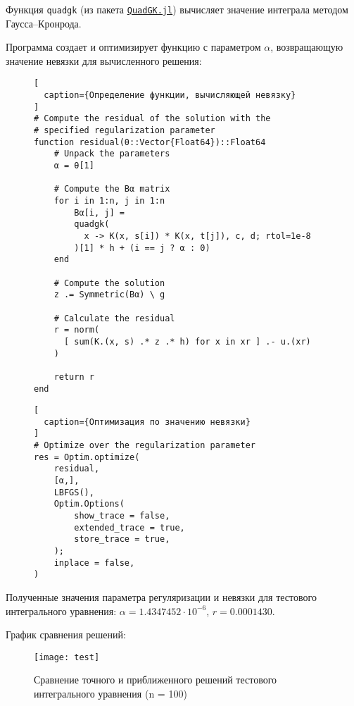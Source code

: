 \newpage

Функция {\footnotesize \texttt{quadgk}} (из пакета \href{https://juliamath.github.io/QuadGK.jl/stable/}{\footnotesize \texttt{QuadGK.jl}}) вычисляет значение интеграла методом Гаусса--Кронрода. \npar

Программа создает и оптимизирует функцию с параметром $ \alpha $, возвращающую значение невязки для вычисленного решения:

\begin{figure}[h!]
\begin{lstlisting}[
  caption={Определение функции, вычисляющей невязку}
]
# Compute the residual of the solution with the
# specified regularization parameter
function residual(θ::Vector{Float64})::Float64
    # Unpack the parameters
    α = θ[1]

    # Compute the Bα matrix
    for i in 1:n, j in 1:n
        Bα[i, j] =
        quadgk(
          x -> K(x, s[i]) * K(x, t[j]), c, d; rtol=1e-8
        )[1] * h + (i == j ? α : 0)
    end

    # Compute the solution
    z .= Symmetric(Bα) \ g

    # Calculate the residual
    r = norm(
      [ sum(K.(x, s) .* z .* h) for x in xr ] .- u.(xr)
    )

    return r
end
\end{lstlisting}
\end{figure}

\begin{figure}[h!]
\begin{lstlisting}[
  caption={Оптимизация по значению невязки}
]
# Optimize over the regularization parameter
res = Optim.optimize(
    residual,
    [α,],
    LBFGS(),
    Optim.Options(
        show_trace = false,
        extended_trace = true,
        store_trace = true,
    );
    inplace = false,
)
\end{lstlisting}
\end{figure}

Полученные значения параметра регуляризации и невязки для тестового интегрального уравнения: $ \alpha = 1.4347452 \cdot 10^{-6} $,
$r = 0.0001430 $. \npar

График сравнения решений:

\captionsetup{justification=centering}

\begin{figure}[h!]
  \centering
  \texttt{[image: test]}
  \caption{Сравнение точного и приближенного решений тестового интегрального уравнения (n = 100)}
\end{figure}

